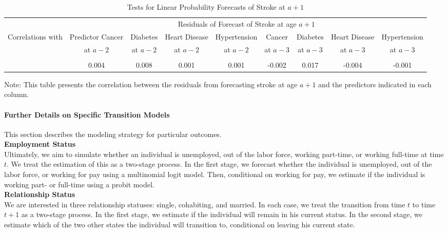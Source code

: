 \begin{landscape}
\begin{table}[H]
\begin{threeparttable}
\caption{Tests for Linear Probability Forecasts of Stroke at $a+1$} \label{table:1storderresidstroke}
\centering
\footnotesize
\begin{tabular}{l *{8}{c}}
\toprule
& \multicolumn{8}{c}{Residuals of Forecast of Stroke at age $a+1$} \\
Correlations with	&	Predictor Cancer &	Diabetes & Heart Disease &	Hypertension &	Cancer	& Diabetes & Heart Disease & Hypertension  \\
                    &	at $a-2$	&	at $a - 2$ & at $a - 2$	& at $a - 2$	& at $a-3$	& at $a - 3$	& at $a - 3$	& at $a - 3$ \\
\midrule \\
&	0.004 &	0.008	&	0.001	&	0.001	&	-0.002	&	0.017 &	-0.004 &	-0.001	\\
\bottomrule
\end{tabular}
\begin{tablenotes}
\footnotesize
\item Note: This table presents the correlation between the residuals from forecasting stroke at age $a+1$ and the predictors indicated in each column.
\end{tablenotes}
\end{threeparttable}
\end{table}

\end{landscape}

\paragraph{Further Details on Specific Transition Models}
\noindent This section describes the modeling strategy for particular outcomes. \\

\noindent \textbf{Employment Status}\\
\noindent Ultimately, we aim to simulate whether an individual is unemployed, out of the labor force, working part-time, or working full-time at
time $t$. We treat the estimation of this as a two-stage process. In the first stage, we forecast whether the individual is unemployed, out of
the labor force, or working for pay using a multinomial logit model. Then, conditional on working for pay, we estimate if
the individual is working part- or full-time using a probit model. \\

\noindent \textbf{Relationship Status}\\
\noindent We are interested in three relationship statuses: single, cohabiting, and married. In each case, we treat the transition
from time $t$ to time $t+1$ as a two-stage process. In the first stage, we estimate if the individual will remain in his
current status. In the second stage, we estimate which of the two other states the individual will transition to, conditional
on leaving his current state. \\

